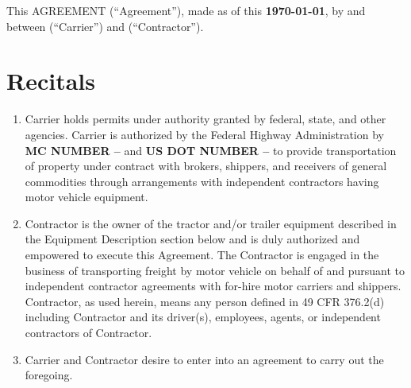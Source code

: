 \noindent%
This AGREEMENT (``Agreement''), made as of this \textbf{\today}, by and
between \textbf{\CarrierName} (``Carrier'') and {\xrfill[-1pt]{0.5pt}}
(``Contractor'').

\section{Recitals}

\begin{enumerate}
    \item Carrier holds permits under authority granted by federal, state,
    and other agencies. Carrier is authorized by the Federal Highway
    Administration by {\textbf{MC NUMBER -- \CarrierMC}} and
    {\textbf{US DOT NUMBER -- \CarrierUSDOT}} to provide transportation
    of property under contract with brokers, shippers, and receivers of
    general commodities through arrangements with independent contractors
    having motor vehicle equipment.
    
    \item Contractor is the owner of the tractor and/or trailer equipment
    described in the Equipment Description section below and is duly
    authorized and empowered to execute this Agreement. The Contractor is
    engaged in the business of transporting freight by motor vehicle on
    behalf of and pursuant to independent contractor agreements with
    for-hire motor carriers and shippers. Contractor, as used herein, means
    any person defined in 49 CFR 376.2(d) including Contractor and its
    driver(s), employees, agents, or independent contractors of Contractor.

    \item Carrier and Contractor desire to enter into an agreement to carry
    out the foregoing.
\end{enumerate}